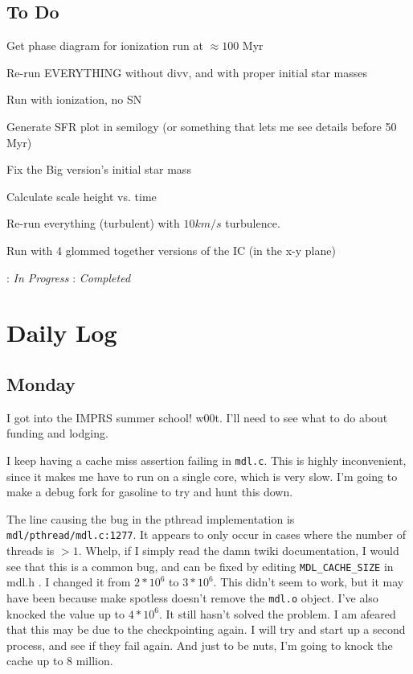 \documentclass[11pt,letterpaper]{article}
\begin{document}
\subsection*{To Do}
\begin{bullets} 
\item \checkmark Get phase diagram for ionization run at $\approx 100$ Myr
\item \checkmark Re-run EVERYTHING without divv, and with proper initial star masses
\item \checkmark Run with ionization, no SN
\item Generate SFR plot in semilogy (or something that lets me see details 
before 50 Myr)
\item Fix the Big version's initial star mass
\item Calculate scale height vs. time
\item Re-run everything (turbulent) with $10km/s$ turbulence.
\item Run with 4 glommed together versions of the IC (in the x-y plane)
\end{bullets}

\textleaf : \textit{In Progress} \qquad \checkmark : \textit{Completed}

\section*{Daily Log}
\subsection*{Monday}
I got into the IMPRS summer school!  w00t.  I'll need to see what to do about
funding and lodging.

I keep having a cache miss assertion failing in \verb!mdl.c!.  This is highly
inconvenient, since it makes me have to run on a single core, which is very 
slow.  I'm going to make a debug fork for gasoline to try and hunt this down.

The line causing the bug in the pthread implementation is 
\verb!mdl/pthread/mdl.c:1277!.  It appears to only occur in cases where the 
number of threads is $>1$.  Whelp, if I simply read the damn twiki 
documentation, I would see that this is a common bug, and can be fixed by
editing \verb!MDL_CACHE_SIZE! in mdl.h . I changed it from $2*10^6$ to $3*10^6$.
This didn't seem to work, but it may have been because make spotless doesn't 
remove the \verb!mdl.o! object.  I've also knocked the value up to $4*10^6$.
It still hasn't solved the problem.  I am afeared that this may be due to
the checkpointing again.  I will try and start up a second process, and see
if they fail again.  And just to be nuts, I'm going to knock the cache up to 8
million.
\end{document}
